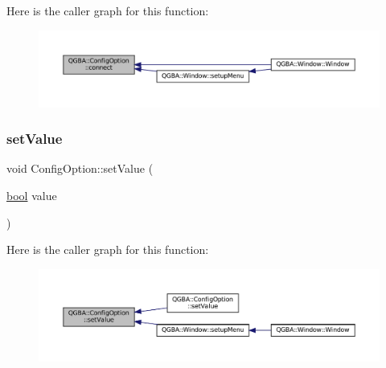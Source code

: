Here is the caller graph for this function\+:
\nopagebreak
\begin{figure}[H]
\begin{center}
\leavevmode
\includegraphics[width=350pt]{class_q_g_b_a_1_1_config_option_abe38d4d9dd27b673bc421a22456d478f_icgraph}
\end{center}
\end{figure}
\mbox{\label{class_q_g_b_a_1_1_config_option_a91abdb09b8bb65ff7c16c69e4f694e7b}} 
\subsubsection{\texorpdfstring{set\+Value}{setValue}\hspace{0.1cm}{\footnotesize\ttfamily [1/5]}}
{\footnotesize\ttfamily void Config\+Option\+::set\+Value (\begin{DoxyParamCaption}\item[{\mbox{\hyperlink{libretro_8h_a4a26dcae73fb7e1528214a068aca317e}{bool}}}]{value }\end{DoxyParamCaption})\hspace{0.3cm}{\ttfamily [slot]}}

Here is the caller graph for this function\+:
\nopagebreak
\begin{figure}[H]
\begin{center}
\leavevmode
\includegraphics[width=350pt]{class_q_g_b_a_1_1_config_option_a91abdb09b8bb65ff7c16c69e4f694e7b_icgraph}
\end{center}
\end{figure}
\mbox{\label{class_q_g_b_a_1_1_config_option_a38e726eff29e2178fbad58c12104ae32}} 
